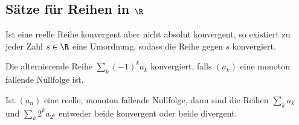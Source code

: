 \subsection{Sätze für Reihen in $\R$}

\begin{prop}
Ist eine reelle Reihe konvergent aber nicht absolut konvergent, so existiert zu
jeder Zahl $s\in\R$ eine Umordnung, sodass die Reihe gegen $s$
konvergiert.
\end{prop}

\begin{prop}[Leibnizkriterium]
Die alternierende Reihe $\sum_k (-1)^k a_k$ konvergiert, falls $(a_k)$ eine
monoton fallende Nullfolge ist.
\end{prop}

\begin{prop}[Verdichtungssatz]
Ist $(a_n)$ eine reelle, monoton fallende Nullfolge, dann sind die Reihen
$\sum_k a_k$ und $\sum_k 2^ka_{2^k}$ entweder beide konvergent oder beide
divergent.
\end{prop}